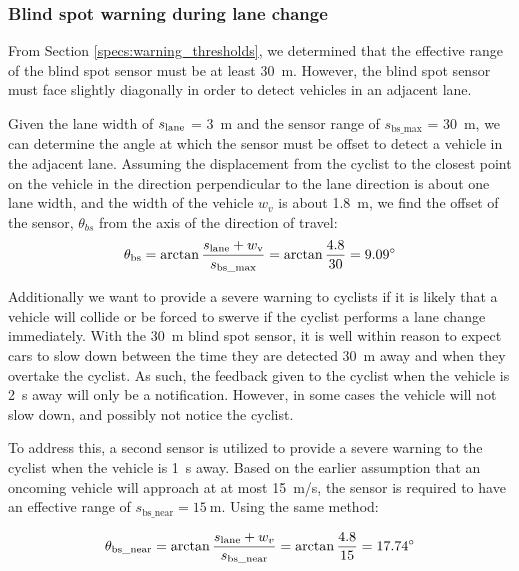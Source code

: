\documentclass[journal]{IEEEtran}
\begin{document}
\subsubsection{Blind spot warning during lane change}
From Section \ref{specs:warning_thresholds}, we determined that the effective range of the blind spot sensor must be at least \SI{30}{\meter}. However, the blind spot sensor must face slightly diagonally in order to detect vehicles in an adjacent lane.

Given the lane width of $s_\text{lane}$ = \SI{3}{\meter} and the sensor range of $s_{\text{bs\_max}}$ = \SI{30}{\meter}, we can determine the angle at which the sensor must be offset to detect a vehicle in the adjacent lane. Assuming the displacement from the cyclist to the closest point on the vehicle in the direction perpendicular to the lane direction is about one lane width, and the width of the vehicle $w_v$ is about \SI{1.8}{\meter}, we find the offset of the sensor, $\theta_{bs}$ from the axis of the direction of travel:
\begin{align}
\theta_\text{bs} = \arctan{\frac{s_\text{lane}+ w_\text{v}}{s_\text{bs\_max}}} = \arctan{\frac{4.8}{30}} = \ang{9.09}
\end{align}

Additionally we want to provide a severe warning to cyclists if it is likely that a vehicle will collide or be forced to swerve if the cyclist performs a lane change immediately. With the \SI{30}{\meter} blind spot sensor, it is well within reason to expect cars to slow down between the time they are detected \SI{30}{\meter} away and when they overtake the cyclist. As such, the feedback given to the cyclist when the vehicle is \SI{2}{\s} away will only be a notification. However, in some cases the vehicle will not slow down, and possibly not notice the cyclist.

To address this, a second sensor is utilized to provide a severe warning to the cyclist when the vehicle is \SI{1}{\s} away. Based on the earlier assumption that an oncoming vehicle will approach at at most \SI{15}{\meter/\s}, the sensor is required to have an effective range of $s_\text{bs\_near} = \SI{15}{\meter}$. Using the same method:

\begin{align}
\theta_\text{bs\_near} = \arctan{\frac{s_\text{lane}+ w_v}{s_{\text{bs\_near}}}} = \arctan{\frac{4.8}{15}} = \ang{17.74}
\end{align}
\end{document}
